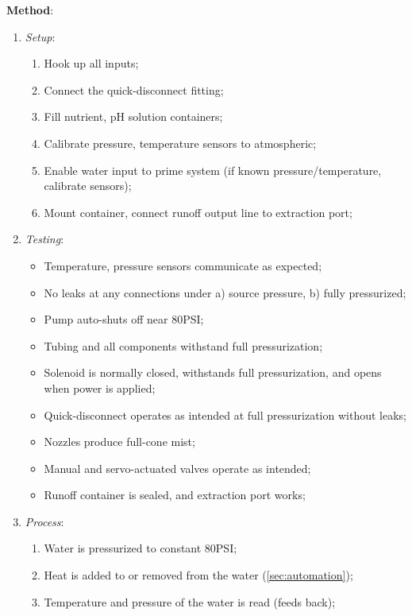 \documentclass{report}
\begin{document}
\textbf{Method}:
\begin{enumerate}
    \item \textit{Setup}:
    \begin{enumerate}
        \item Hook up all inputs;
        \item Connect the quick-disconnect fitting;
        \item Fill nutrient, pH solution containers;
        \item Calibrate pressure, temperature sensors to atmospheric;
        \item Enable water input to prime system (if known pressure/temperature, calibrate sensors);
        \item Mount container, connect runoff output line to extraction port;
    \end{enumerate}
\newpage
    \item \textit{Testing}:
    \begin{itemize}
        \item Temperature, pressure sensors communicate as expected;
        \item No leaks at any connections under a) source pressure, b) fully pressurized;
        \item Pump auto-shuts off near 80PSI;
        \item Tubing and all components withstand full pressurization;
        \item Solenoid is normally closed, withstands full pressurization, and opens when power is applied;
        \item Quick-disconnect operates as intended at full pressurization without leaks;
        \item Nozzles produce full-cone mist;
        \item Manual and servo-actuated valves operate as intended;
        \item Runoff container is sealed, and extraction port works;
    \end{itemize}
    \item \textit{Process}:
    \begin{enumerate}
        \item Water is pressurized to constant 80PSI;
        \item Heat is added to or removed from the water (\ref{sec:automation}); %
        \item Temperature and pressure of the water is read (feeds back);

\end{enumerate}
\end{enumerate}
\end{document}
